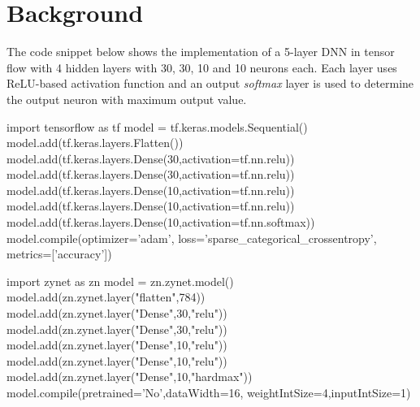 \section{Background}

\cite{xilinxddnk}
The code snippet below shows the implementation of a 5-layer DNN in tensor flow with 4 hidden layers with 30, 30, 10 and 10 neurons each.
Each layer uses ReLU-based activation function and an output \emph{softmax} layer is used to determine the output neuron with maximum output value. 


\begin{python}
import tensorflow as tf
model = tf.keras.models.Sequential()
model.add(tf.keras.layers.Flatten())
model.add(tf.keras.layers.Dense(30,activation=tf.nn.relu))
model.add(tf.keras.layers.Dense(30,activation=tf.nn.relu))
model.add(tf.keras.layers.Dense(10,activation=tf.nn.relu))
model.add(tf.keras.layers.Dense(10,activation=tf.nn.relu))
model.add(tf.keras.layers.Dense(10,activation=tf.nn.softmax))
model.compile(optimizer='adam',
    loss='sparse_categorical_crossentropy',
    metrics=['accuracy'])
\end{python}


\begin{python}
import zynet as zn
model = zn.zynet.model()
model.add(zn.zynet.layer("flatten",784))
model.add(zn.zynet.layer("Dense",30,"relu"))
model.add(zn.zynet.layer("Dense",30,"relu"))
model.add(zn.zynet.layer("Dense",10,"relu"))
model.add(zn.zynet.layer("Dense",10,"relu"))
model.add(zn.zynet.layer("Dense",10,"hardmax"))
model.compile(pretrained='No',dataWidth=16,
    weightIntSize=4,inputIntSize=1)
\end{python}
